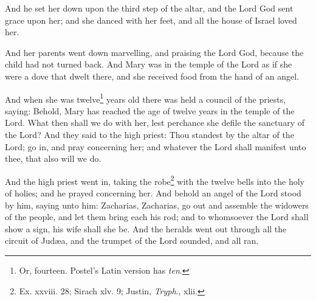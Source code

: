 \pend\pstart
And he set her down upon the third step of the altar, and the Lord God sent grace upon her; and she danced with her feet, and all the house of Israel loved her.

\pend\pstart
{}

\pend\pstart
And her parents went down marvelling, and praising the Lord God, because the child had not turned back. And Mary was in the temple of the Lord as if she were a dove that dwelt there, and she received food from the hand of an angel.

\pend\pstart
And when she was twelve\footnote{Or, fourteen. Postel's Latin version has \textit{ten}.} years old there was held a council of the priests, saying: Behold, Mary has reached the age of twelve years in the temple of the Lord. What then shall we do with her, lest perchance she defile the sanctuary of the Lord? And they said to the high priest: Thou standest by the altar of the Lord; go in, and pray concerning her; and whatever the Lord shall manifest unto thee, that also will we do.

\pend\pstart
And the high priest went in, taking the robe\footnote{Ex. xxviii. 28; Sirach xlv. 9; Justin, \textit{Tryph}., xlii.} with the twelve bells into the holy of holies; and he prayed concerning her. And behold an angel of the Lord stood by him, saying unto him: Zacharias, Zacharias, go out and assemble the widowers of the people, and let them bring each his rod; and to whomsoever the Lord shall show a sign, his wife shall she be. And the heralds went out through all the circuit of Judæa, and the trumpet of the Lord sounded, and all ran.

\pend\pstart
{}

\pend
